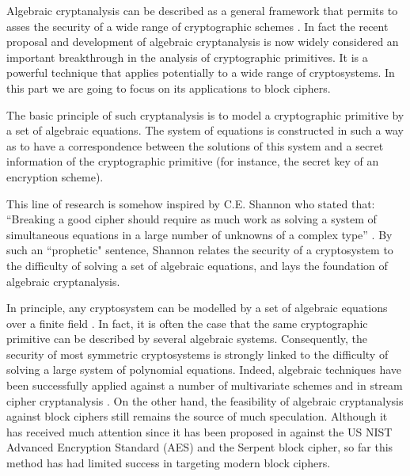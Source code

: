 Algebraic cryptanalysis can be described as a general framework that permits to asses the security of a wide range of cryptographic schemes \cite{ars:thesis2005,courtois-pieprzyk:asiacrypt02,courtois-meier:eurocrypt2003,courtois:crypto2003,faugere-joux:crypto03,faugere-perret:eurocrypt06,faugere-perret:crypto06,faugere-levy-perret:crypto2008}. In fact the recent proposal and development of algebraic cryptanalysis is now widely considered an important breakthrough in the analysis of cryptographic primitives. It is a powerful technique that applies potentially to a wide range of cryptosystems. In this part we are going to focus on its applications to block ciphers.

The basic principle of such cryptanalysis is to model a cryptographic primitive by a set of algebraic equations. The system of equations is constructed in such a way as to have a correspondence between the solutions of this system and a secret information of the cryptographic primitive (for instance, the secret key of an encryption scheme).

This line of research is somehow inspired by C.E. Shannon who stated that: ``Breaking a good cipher should require as much work as solving a system of simultaneous equations in a large number of unknowns of a complex type'' \cite{Shannon1949}. By such an ``prophetic" sentence, Shannon relates the security of a cryptosystem to the difficulty of solving a set of algebraic equations, and lays the foundation of algebraic cryptanalysis.

In principle, any cryptosystem can be modelled by a set of algebraic equations over a finite field \cite{garey-johnson:1979}. In fact, it is often the case that the same cryptographic primitive can be described by several algebraic systems. Consequently, the security of most symmetric cryptosystems is strongly linked to the difficulty of solving a large system of polynomial equations. Indeed, algebraic techniques have been successfully applied against a number of multivariate schemes and in stream cipher cryptanalysis \cite{ars:thesis2005,courtois-meier:eurocrypt2003,courtois:crypto2003,faugere-joux:crypto03,faugere-perret:eurocrypt06,faugere-perret:crypto06,faugere-levy-perret:crypto2008}. On the other hand, the feasibility of algebraic cryptanalysis against block ciphers still remains the source of much speculation. Although it has received much attention since it has been proposed in \cite{courtois-pieprzyk:asiacrypt02,alg-aes-book} against the US NIST Advanced Encryption Standard (AES) and the Serpent block cipher, so far this method has had limited success in targeting modern block ciphers.

